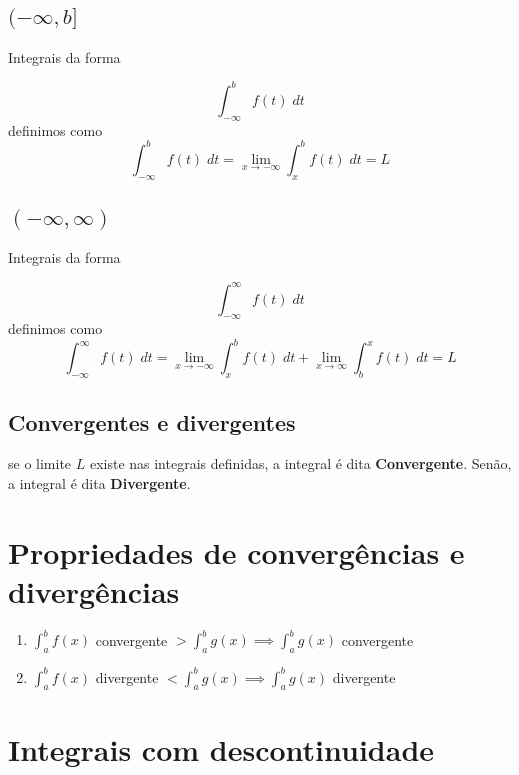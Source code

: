 \documentclass[14pt]{extreport}
\theoremstyle{definition}
\begin{document}
\subsection{\((-\infty, b]\)}
Integrais da forma

\begin{equation}
    \int_{-\infty}^{b} f(t) \; dt
\end{equation}
definimos como
\begin{equation}
    \int_{-\infty}^{b} f(t) \; dt = \lim_{x \to -\infty} \int_{x}^{b} f(t) \; dt = L
\end{equation}

\subsection{\((-\infty, \infty)\)}
Integrais da forma

\begin{equation}
    \int_{-\infty}^{\infty} f(t) \; dt
\end{equation}
definimos como
\begin{equation}
    \int_{-\infty}^{\infty} f(t) \; dt = 
        \lim_{x \to -\infty} \int_{x}^{b} f(t) \; dt +  
        \lim_{x \to \infty} \int_{b}^{x} f(t) \; dt = L
\end{equation}

\subsection{Convergentes e divergentes}

se o limite \(L\) existe nas integrais definidas, a integral é dita \textbf{Convergente}. Senão, a integral é dita \textbf{Divergente}.


\section{Propriedades de convergências e divergências}

\begin{enumerate}
    \item \( \int_{a}^{b} f(x)\) convergente \(> \int_{a}^{b} g(x) \implies \int_{a}^{b} g(x)\) convergente
    \item \(\int_{a}^{b} f(x)\) divergente \(< \int_{a}^{b} g(x) \implies \int_{a}^{b} g(x)\) divergente
\end{enumerate}

\section{Integrais com descontinuidade}
\end{document}

